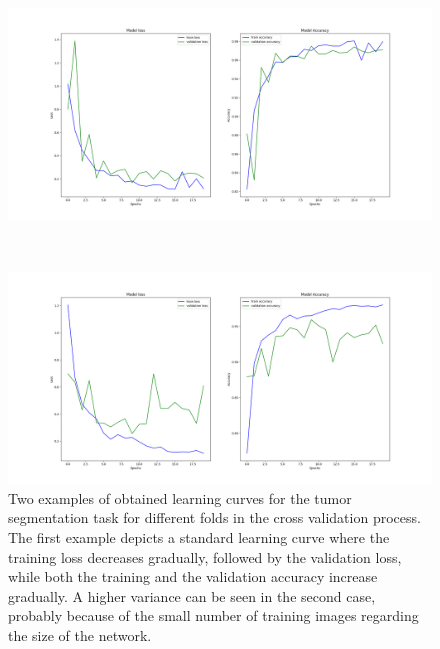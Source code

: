 {\begin{figure}[!ht]
\centering
\begin{minipage}{\linewidth}
\includegraphics[width=\linewidth]{images/learningCurveTumorVE_pat4}
\end{minipage} \\
\begin{minipage}{\linewidth}
\includegraphics[width=\linewidth]{images/learningCurveTumorVE_pat6}
\end{minipage}
\caption{Two examples of obtained learning curves for the tumor segmentation task for different folds in the cross validation process. The first example depicts a standard learning curve where the training loss decreases gradually, followed by the validation loss, while both the training and the validation accuracy increase gradually. A higher variance can be seen in the second case, probably because of the small number of training images regarding the size of the network.}
\label{fig:learningCurvesIJCARS}
\end{figure}
}


